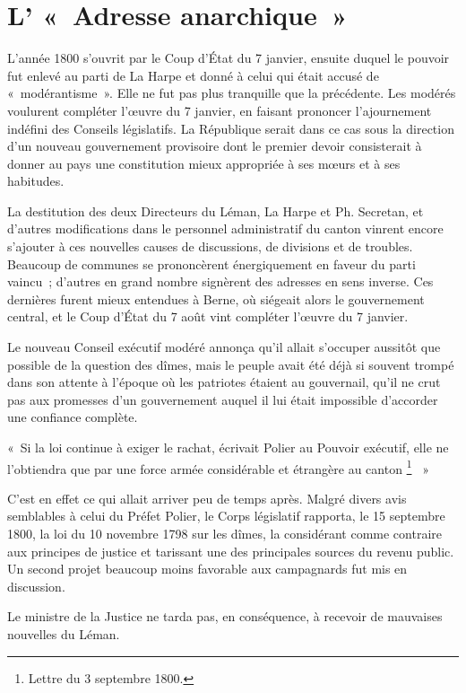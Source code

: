 \documentclass[french,twoside]{book} %
\newenvironment{quoteblock}%
  {\begin{quoting}}
  {\end{quoting}}
\newenvironment{quotebar}{%
    \def\FrameCommand{{\color{rubric!10!}\vrule width 0.5em} \hspace{0.9em}}%
    \def\OuterFrameSep{\itemsep} %
    \MakeFramed {\advance\hsize-\width \FrameRestore}
  }%
  {%
    \endMakeFramed
  }
\renewenvironment{quoteblock}%
  {%
    \savenotes
    \setstretch{0.9}
    \normalfont
    \begin{quotebar}
  }
  {%
    \end{quotebar}
    \spewnotes
  }
\begin{document}
\section[L’ « Adresse anarchique »]{L’ « Adresse anarchique »}
\noindent L’année 1800 s’ouvrit par le Coup d’État du 7 janvier, ensuite duquel le pouvoir fut enlevé au parti de La Harpe et donné à celui qui était accusé de « modérantisme ». Elle ne fut pas plus tranquille que la précédente. Les modérés voulurent compléter l’œuvre du 7 janvier, en faisant prononcer l’ajournement indéfini des Conseils législatifs. La République serait dans ce cas sous la direction d’un nouveau gouvernement provisoire dont le premier devoir consisterait à donner au pays une constitution mieux appropriée à ses mœurs et à ses habitudes.\par
La destitution des deux Directeurs du Léman, La Harpe et Ph. Secretan, et d’autres modifications dans le personnel administratif du canton vinrent encore s’ajouter à ces nouvelles causes de discussions, de divisions et de troubles. Beaucoup de communes se prononcèrent énergiquement en faveur du parti vaincu ; d’autres en grand nombre signèrent des adresses en sens inverse. Ces dernières furent mieux entendues à Berne, où siégeait alors le gouvernement central, et le Coup d’État du 7 août vint compléter l’œuvre du 7 janvier.\par
Le nouveau Conseil exécutif modéré annonça qu’il allait s’occuper aussitôt que possible de la question des dîmes, mais le peuple avait été déjà si souvent trompé dans son attente à l’époque où les patriotes étaient au gouvernail, qu’il ne crut pas aux promesses d’un gouvernement auquel il lui était impossible d’accorder une confiance complète.\par

\begin{quoteblock}
 \noindent « Si la loi continue à exiger le rachat, écrivait Polier au Pouvoir exécutif, elle ne l’obtiendra que par une force armée considérable et étrangère au canton \footnote{Lettre du 3 septembre 1800.}  »
 \end{quoteblock}

\noindent C’est en effet ce qui allait arriver peu de temps après. Malgré divers avis semblables à celui du Préfet Polier, le Corps législatif rapporta, le 15 septembre 1800, la loi du 10 novembre 1798 sur les dîmes, la considérant comme contraire aux principes de justice et tarissant une des principales sources du revenu public. Un second projet beaucoup moins favorable aux campagnards fut mis en discussion.\par
Le ministre de la Justice ne tarda pas, en conséquence, à recevoir de mauvaises nouvelles du Léman.\par
\end{document}
